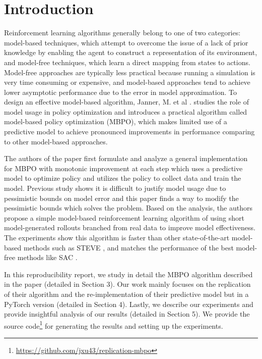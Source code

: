 \section{Introduction}

Reinforcement learning algorithms generally belong to one of two categories: model-based techniques, which attempt to overcome the issue of a lack of prior knowledge by enabling the agent to construct a representation of its environment, and model-free techniques, which learn a direct mapping from states to actions. Model-free approaches are typically less practical because running a simulation is very time consuming or expensive, and model-based approaches tend to achieve lower asymptotic performance due to the error in model approximation. To design an effective model-based algorithm, Janner, M. et al \cite{ref1}. studies the role of model usage in policy optimization and introduces a practical algorithm called model-based policy optimization (MBPO), which makes limited use of a predictive model to achieve pronounced improvements in performance comparing to other model-based approaches.

The authors of the paper \cite{ref1} first formulate and analyze a general implementation for MBPO with monotonic improvement at each step which uses a predictive model to optimize policy and utilizes the policy to collect data and train the model. Previous study shows it is difficult to justify model usage due to pessimistic bounds on model error and this paper finds a way to modify the pessimistic bounds which solves the problem. Based on the analysis, the authors propose a simple model-based reinforcement learning algorithm of using short model-generated rollouts branched from real data to improve model effectiveness. The experiments show this algorithm is faster than other state-of-the-art model-based methods such as STEVE \cite{ref2}, and matches the performance of the best model-free methods like SAC \cite{ref3}.

In this reproducibility report, we study in detail the MBPO algorithm described in the paper (detailed in Section 3). Our work mainly focuses on the replication of their algorithm and the re-implementation of their predictive model but in a PyTorch version (detailed in Section 4). Lastly, we describe our experiments and provide insightful analysis of our results (detailed in Section 5). We provide the source code\footnote{\url{https://github.com/jxu43/replication-mbpo}} for generating the results and setting up the experiments.

